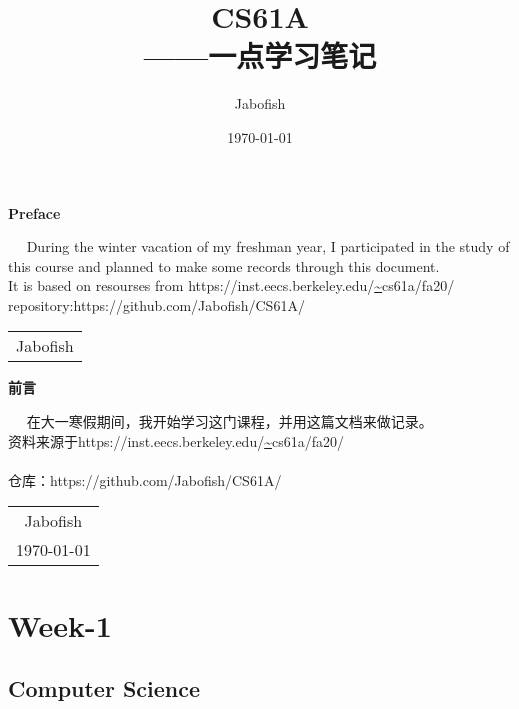 \documentclass{ctexart}
\title{{\Huge{\textbf{CS61A}}}\\——一点学习笔记}
\author{Jabofish}
\date{\today}
\begin{document}
\maketitle
\thispagestyle{empty}
\newpage


\setcounter{page}{0}
\begin{center}
    \Huge\textbf{Preface}
\end{center}~\ %
During the winter vacation of my freshman year,
I participated in the study of this course 
and planned to make some records through this document.\\
It is based on resourses from https://inst.eecs.berkeley.edu/\url{~}cs61a/fa20/
~\\repository:https://github.com/Jabofish/CS61A/
\begin{flushright}
    \begin{tabular}{c}
        Jabofish
    \end{tabular}
\end{flushright}
\begin{center}
    \Huge\textbf{前言}
\end{center}~\ %
在大一寒假期间，我开始学习这门课程，并用这篇文档来做记录。\\
资料来源于https://inst.eecs.berkeley.edu/\url{~}cs61a/fa20/
~\\\\仓库：https://github.com/Jabofish/CS61A/
\begin{flushright}
    \begin{tabular}{c}
        Jabofish\\
        \today
    \end{tabular}
\end{flushright}

\newpage


\tableofcontents
\newpage


\setcounter{page}{1}


\section{Week-1}

\subsection{Computer Science}
\end{document}
